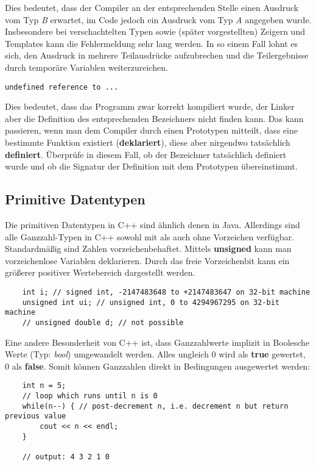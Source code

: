 Dies bedeutet, dass der Compiler an der entsprechenden Stelle einen Ausdruck vom Typ \emph{B} erwartet, im Code jedoch ein Ausdruck vom Typ \emph{A} angegeben wurde. Insbesondere bei verschachtelten Typen sowie (später vorgestellten) Zeigern und Templates kann die Fehlermeldung sehr lang werden. In so einem Fall lohnt es sich, den Ausdruck in mehrere Teilausdrücke aufzubrechen und die Teilergebnisse durch temporäre Variablen weiterzureichen.

\begin{verbatim}
undefined reference to ...
\end{verbatim}

Dies bedeutet, dass das Programm zwar korrekt kompiliert wurde, der Linker aber die Definition des entsprechenden Bezeichners nicht finden kann.
Das kann passieren, wenn man dem Compiler durch einen Prototypen mitteilt, dass eine bestimmte Funktion existiert (\textbf{deklariert}), diese aber nirgendwo tatsächlich \textbf{definiert}.
Überprüfe in diesem Fall, ob der Bezeichner tatsächlich definiert wurde und ob die Signatur der Definition mit dem Prototypen übereinstimmt.


\subsection{Primitive Datentypen}
Die primitiven Datentypen in C++ sind ähnlich denen in Java.
Allerdings sind alle Ganzzahl-Typen in C++ sowohl mit als auch ohne Vorzeichen verfügbar.
Standardmäßig sind Zahlen vorzeichenbehaftet.
Mittels \textbf{unsigned} kann man vorzeichenlose Variablen deklarieren.
Durch das freie Vorzeichenbit kann ein größerer positiver Wertebereich dargestellt werden.

\begin{lstlisting}
 	int i; // signed int, -2147483648 to +2147483647 on 32-bit machine
	unsigned int ui; // unsigned int, 0 to 4294967295 on 32-bit machine
	// unsigned double d; // not possible
\end{lstlisting}

Eine andere Besonderheit von C++ ist, dass Ganzzahlwerte implizit in Boolesche Werte (Typ: \emph{bool}) umgewandelt werden.
Alles ungleich 0 wird als \textbf{true} gewertet, 0 als \textbf{false}.
Somit können Ganzzahlen direkt in Bedingungen ausgewertet werden:

\begin{lstlisting}
 	int n = 5;
 	// loop which runs until n is 0
 	while(n--) { // post-decrement n, i.e. decrement n but return previous value
  		cout << n << endl;
 	}

	// output: 4 3 2 1 0
\end{lstlisting}


